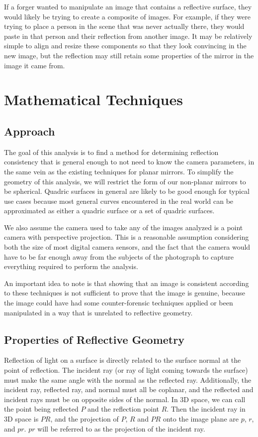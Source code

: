 \documentclass{thesis}
\begin{document}
If a forger wanted to manipulate an image that contains a reflective surface, they would likely be trying to create a composite of images. For example, if they were trying to place a person in the scene that was never actually there, they would paste in that person and their reflection from another image. It may be relatively simple to align and resize these components so that they look convincing in the new image, but the reflection may still retain some properties of the mirror in the image it came from.




\chapter{Mathematical Techniques}
\section{Approach}
The goal of this analysis is to find a method for determining reflection consistency that is general enough to not need to know the camera parameters, in the same vein as the existing techniques for planar mirrors. To simplify the geometry of this analysis, we will restrict the form of our non-planar mirrors to be spherical. Quadric surfaces in general are likely to be good enough for typical use cases because most general curves encountered in the real world can be approximated as either a quadric surface or a set of quadric surfaces.

We also assume the camera used to take any of the images analyzed is a point camera with perspective projection. This is a reasonable assumption considering both the size of most digital camera sensors, and the fact that the camera would have to be far enough away from the subjects of the photograph to capture everything required to perform the analysis.

An important idea to note is that showing that an image is consistent according to these techniques is not sufficient to prove that the image is genuine, because the image could have had some counter-forensic techniques applied or been manipulated in a way that is unrelated to reflective geometry.

\section{Properties of Reflective Geometry}
Reflection of light on a surface is directly related to the surface normal at the point of reflection. The incident ray (or ray of light coming towards the surface) must make the same angle with the normal as the reflected ray.  Additionally, the incident ray, reflected ray, and normal must all be coplanar, and the reflected and incident rays must be on opposite sides of the normal. In 3D space, we can call the point being reflected $P$ and the reflection point $R$. Then the incident ray in 3D space is $PR$, and the projection of $P$, $R$ and $PR$ onto the image plane are $p$, $r$, and $pr$. $pr$ will be referred to as the projection of the incident ray.
\end{document}
